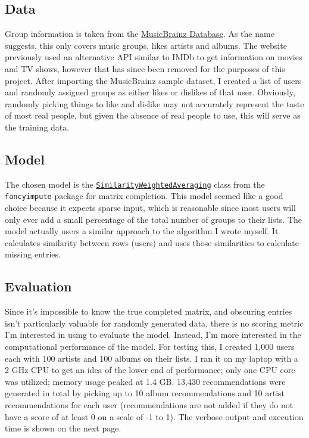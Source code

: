 \documentclass[12pt]{article}
\begin{document}
	\subsection*{Data}
	Group information is taken from the \href{https://musicbrainz.org/doc/MusicBrainz_Database/}{MusicBrainz Database}. As the name suggests, this only covers music groups, likes artists and albums. The website previously used an alternative API similar to IMDb to get information on movies and TV shows, however that has since been removed for the purposes of this project. After importing the MusicBrainz sample dataset, I created a list of users and randomly assigned groups as either likes or dislikes of that user. Obviously, randomly picking things to like and dislike may not accurately represent the taste of most real people, but given the absence of real people to use, this will serve as the training data.

	\subsection*{Model}
	The chosen model is the \href{https://github.com/iskandr/fancyimpute/blob/master/fancyimpute/similarity_weighted_averaging.py}{\tt SimilarityWeightedAveraging} class from the {\tt fancyimpute} package for matrix completion. This model seemed like a good choice because it expects sparse input, which is reasonable since most users will only ever add a small percentage of the total number of groups to their lists. The model actually users a similar approach to the algorithm I wrote myself. It calculates similarity between rows (users) and uses those similarities to calculate missing entries.

	\subsection*{Evaluation}
	Since it's impossible to know the true completed matrix, and obscuring entries isn't particularly valuable for randomly generated data, there is no scoring metric I'm interested in using to evaluate the model. Instead, I'm more interested in the computational performance of the model. For testing this, I created 1,000 users each with 100 artists and 100 albums on their lists. I ran it on my laptop with a 2 GHz CPU to get an idea of the lower end of performance; only one CPU core was utilized; memory usage peaked at 1.4 GB. 13,430 recommendations were generated in total by picking up to 10 album recommendations and 10 artist recommendations for each user (recommendations are not added if they do not have a score of at least 0 on a scale of -1 to 1). The verbose output and execution time is shown on the next page.
\end{document}
